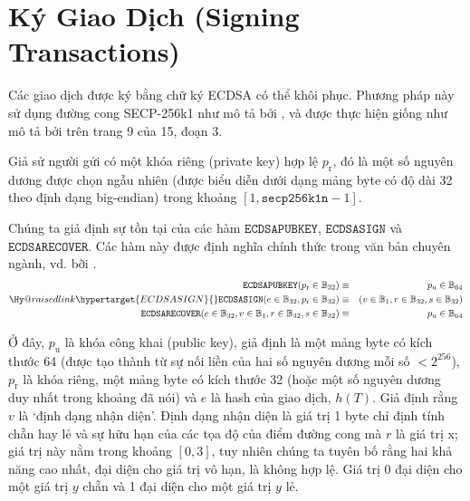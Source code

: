\documentclass[9pt,oneside]{amsart}
\makeatletter
\newcommand{\linkdest}[1]{\Hy@raisedlink{\hypertarget{#1}{}}}
\makeatother
\begin{document}
\section{Ký Giao Dịch (Signing Transactions)}\label{app:signing}

Các giao dịch được ký bằng chữ ký ECDSA có thể khôi phục. Phương pháp này sử dụng đường cong SECP-256k1 như mô tả bởi \cite{Courtois2014}, và được thực hiện giống như mô tả bởi \cite{gura2004comparing} trên trang 9 của 15, đoạn 3.

Giả sử người gửi có một khóa riêng (private key) hợp lệ $p_{\mathrm{r}}$, đó là một số nguyên dương được chọn ngẫu nhiên (được biểu diễn dưới dạng mảng byte có độ dài 32 theo định dạng big-endian) trong khoảng \hbox{$[1, \mathtt{secp256k1n} - 1]$}.

Chúng ta giả định sự tồn tại của các hàm $\mathtt{ECDSAPUBKEY}$, $\mathtt{ECDSASIGN}$ và $\mathtt{ECDSARECOVER}$. Các hàm này được định nghĩa chính thức trong văn bản chuyên ngành, vd. bỡi \cite{ECDSAcerticom}.
\begin{eqnarray}
\mathtt{ECDSAPUBKEY}(p_{\mathrm{r}} \in \mathbb{B}_{32}) & \equiv & p_{\mathrm{u}} \in \mathbb{B}_{64} \\
\linkdest{ECDSASIGN}\mathtt{ECDSASIGN}(e \in \mathbb{B}_{32}, p_{\mathrm{r}} \in \mathbb{B}_{32}) & \equiv & (v \in \mathbb{B}_{1}, r \in \mathbb{B}_{32}, s \in \mathbb{B}_{32}) \\
\mathtt{ECDSARECOVER}(e \in \mathbb{B}_{32}, v \in \mathbb{B}_{1}, r \in \mathbb{B}_{32}, s \in \mathbb{B}_{32}) & \equiv & p_{\mathrm{u}} \in \mathbb{B}_{64}
\end{eqnarray}

Ở đây, $p_{\mathrm{u}}$ là khóa công khai (public key), giả định là một mảng byte có kích thước 64 (được tạo thành từ sự nối liền của hai số nguyên dương mỗi số $< 2^{256}$),
$p_{\mathrm{r}}$ là khóa riêng, một mảng byte có kích thước 32 (hoặc một số nguyên dương duy nhất trong khoảng đã nói) và $e$ là hash của giao dịch, \hyperlink{h_of_T}{$h(T)$}.
Giả định rằng \hypertarget{v}{}$v$ là `định dạng nhận diện'.
Định dạng nhận diện là giá trị 1 byte chỉ định tính chẵn hay lẻ và sự hữu hạn của các tọa độ của điểm đường cong mà $r$ là giá trị x; giá trị này nằm trong khoảng $[0, 3]$, tuy nhiên chúng ta tuyên bố rằng hai khả năng cao nhất, đại diện cho giá trị vô hạn, là không hợp lệ.
Giá trị 0 đại diện cho một giá trị $y$ chẵn và 1 đại diện cho một giá trị $y$ lẻ.

\newcommand{\slimit}{\ensuremath{\text{s-limit}}}
\end{document}

